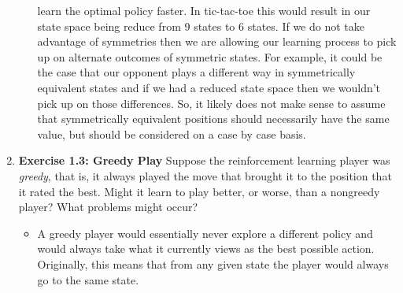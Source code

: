 \documentclass[12pt]{article}
\begin{document}
\begin{enumerate}[label=(\alph*)]
\begin{itemize}
    learn the optimal policy faster. In tic-tac-toe this would result in our state space being reduce from 9
    states to 6 states. If we do not take advantage of symmetries then we are allowing our learning process to 
    pick up on alternate outcomes of symmetric states. For example, it could be the case that our opponent plays a
    different way in symmetrically equivalent states and if we had a reduced state space then we wouldn't pick up
    on those differences. So, it likely does not make sense to assume that symmetrically equivalent positions should 
    necessarily have the same value, but should be considered on a case by case basis.
  \end{itemize}
  \item \textbf{Exercise 1.3: Greedy Play} Suppose the reinforcement learning player was \textit{greedy},
  that is, it always played the move that brought it to the position that it rated the best. Might it
  learn to play better, or worse, than a nongreedy player? What problems might occur?
  \begin{itemize}
    \item A greedy player would essentially never explore a different policy and would always take what
    it currently views as the best possible action. Originally, this means that from any given state the 
    player would always go to the same state.
  \end{itemize}
\end{enumerate}
\end{document}
